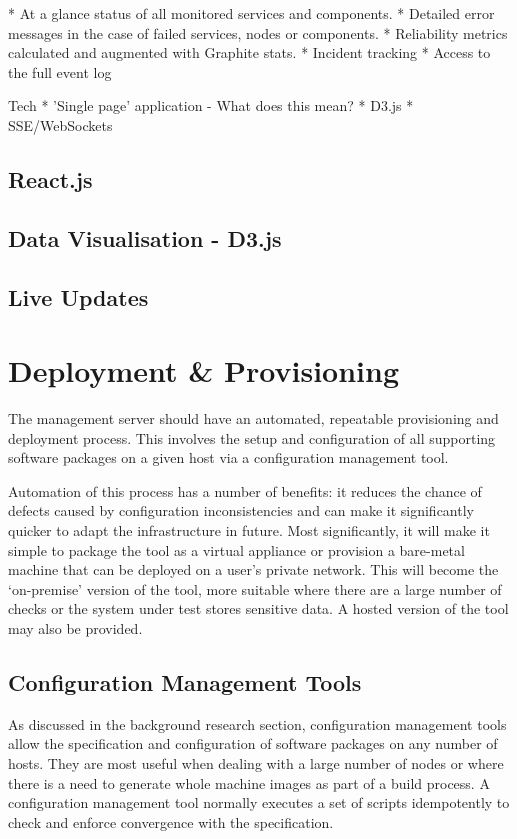 \documentclass{cshonours}
\begin{document}
* At a glance status of all monitored services and components.
* Detailed error messages in the case of failed services, nodes or components.
* Reliability metrics calculated and augmented with Graphite stats.
* Incident tracking
* Access to the full event log

Tech
* 'Single page' application - What does this mean?
* D3.js
* SSE/WebSockets

\subsection{React.js}
\subsection{Data Visualisation - D3.js}
\subsection{Live Updates}

\pagebreak
\section{Deployment \& Provisioning}

The management server should have an automated, repeatable provisioning and deployment process. This involves the setup and configuration of all supporting software packages on a given host via a configuration management tool.

Automation of this process has a number of benefits: it reduces the chance of defects caused by configuration inconsistencies and can make it significantly quicker to adapt the infrastructure in future. Most significantly, it will make it simple to package the tool as a virtual appliance or provision a bare-metal machine that can be deployed on a user's private network. This will become the `on-premise' version of the tool, more suitable where there are a large number of checks or the system under test stores sensitive data. A hosted version of the tool may also be provided.

\subsection{Configuration Management Tools}

As discussed in the background research section, configuration management tools allow the specification and configuration of software packages on any number of hosts. They are most useful when dealing with a large number of nodes or where there is a need to generate whole machine images as part of a build process. A configuration management tool normally executes a set of scripts idempotently to check and enforce convergence with the specification.
\end{document}
